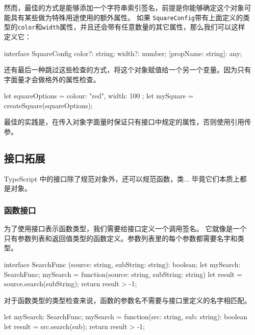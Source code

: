 然而，最佳的方式是能够添加一个字符串索引签名，前提是你能够确定这个对象可能具有某些做为特殊用途使用的额外属性。 如果 \texttt{SquareConfig}带有上面定义的类型的\texttt{color}和\texttt{width}属性，并且还会带有任意数量的其它属性，那么我们可以这样定义它：

\begin{TypeScript}
interface SquareConfig {
    color?: string;
    width?: number;
    [propName: string]: any;
}
\end{TypeScript}

还有最后一种跳过这些检查的方式，将这个对象赋值给一个另一个变量。因为只有字面量才会做格外的属性检查。

\begin{TypeScript}
let squareOptions = { colour: "red", width: 100 };
let mySquare = createSquare(squareOptions);
\end{TypeScript}

最佳的实践是，在传入对象字面量时保证只有接口中规定的属性，否则使用引用传参。

\subsection{接口拓展}

TypeScript 中的接口除了规范对象外，还可以规范函数，类... 毕竟它们本质上都是对象。

\subsubsection*{函数接口}

为了使用接口表示函数类型，我们需要给接口定义一个调用签名。 它就像是一个只有参数列表和返回值类型的函数定义。参数列表里的每个参数都需要名字和类型。

\begin{TypeScript}
interface SearchFunc {
    (source: string, subString: string): boolean;
}
let mySearch: SearchFunc;
mySearch = function(source: string, subString: string) {
    let result = source.search(subString);
    return result > -1;
}
\end{TypeScript}

对于函数类型的类型检查来说，函数的参数名不需要与接口里定义的名字相匹配。 

\begin{TypeScript}
let mySearch: SearchFunc;
mySearch = function(src: string, sub: string): boolean {
    let result = src.search(sub);
    return result > -1;
}
\end{TypeScript}

